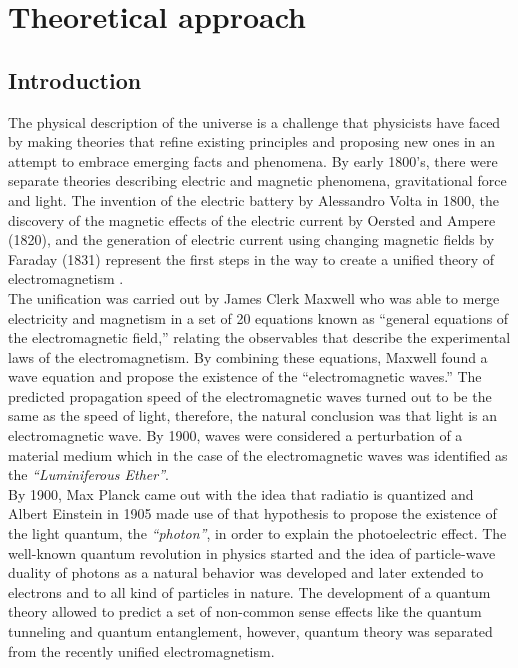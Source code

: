 \chapter{Theoretical approach}
\label{ch:Pyridine}

\section{Introduction}
\label{secc:Intro_th}

\noindent The physical description of the universe is a challenge that physicists have faced by making theories that refine existing principles and proposing new ones in an attempt to embrace emerging facts and phenomena. By early 1800's, there were separate theories describing electric and magnetic phenomena, gravitational force and light. The invention of the electric battery by Alessandro Volta in 1800, the discovery of the magnetic effects of the electric current by Oersted and Ampere (1820), and the generation of electric current using changing magnetic fields by Faraday (1831) represent the first steps in the way to create a unified theory of electromagnetism \cite{griffiths}.\\

\noindent The unification was carried out by James Clerk Maxwell who was able to merge electricity and magnetism in a set of 20 equations known as ``general equations of the electromagnetic field,'' relating the observables that describe the experimental laws of the electromagnetism. By combining these equations, Maxwell found a wave equation and propose the existence of the ``electromagnetic waves.'' The predicted propagation speed of the electromagnetic waves turned out to be the same as the speed of light, therefore, the natural conclusion was that light is an electromagnetic wave\cite{maxwell}. By 1900, waves were considered a perturbation of a material medium which in the case of the electromagnetic waves was identified as the \textit{``Luminiferous Ether''}.\\

\noindent By 1900, Max Planck came out with the idea that radiatio is quantized\cite{planck} and Albert Einstein in 1905 made use of that hypothesis to propose the existence of the light quantum, the \textit{``photon''}, in order to explain the photoelectric effect\cite{photoeffect}. The well-known quantum revolution in physics started and the idea of particle-wave duality of photons as a natural behavior was developed and later extended to electrons and to all kind of particles in nature. The development of a quantum theory allowed to predict a set of non-common sense effects like the quantum tunneling and quantum entanglement, however, quantum theory was separated from the recently unified electromagnetism.\\

